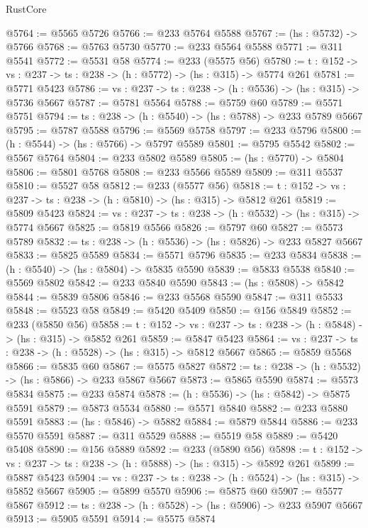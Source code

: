 \begin{lexlean}{RustCore}
\begin{coremodule}
@5764 := @5565 @5726
@5766 := @233 @5764 @5588
@5767 := (hs : @5732) -> @5766
@5768 := @5763 @5730
@5770 := @233 @5564 @5588
@5771 := @311 @5541
@5772 := @5531 @58
@5774 := @233 (@5575 @56)
@5780 := {t : @152} -> {vs : @237} -> {ts : @238} -> (h : @5772) -> (hs : @315) -> @5774 @261
@5781 := @5771 @5423
@5786 := {vs : @237} -> {ts : @238} -> (h : @5536) -> (hs : @315) -> @5736 @5667
@5787 := @5781 @5564
@5788 := @5759 @60
@5789 := @5571 @5751
@5794 := {ts : @238} -> (h : @5540) -> (hs : @5788) -> @233 @5789 @5667
@5795 := @5787 @5588
@5796 := @5569 @5758
@5797 := @233 @5796
@5800 := (h : @5544) -> (hs : @5766) -> @5797 @5589
@5801 := @5795 @5542
@5802 := @5567 @5764
@5804 := @233 @5802 @5589
@5805 := (hs : @5770) -> @5804
@5806 := @5801 @5768
@5808 := @233 @5566 @5589
@5809 := @311 @5537
@5810 := @5527 @58
@5812 := @233 (@5577 @56)
@5818 := {t : @152} -> {vs : @237} -> {ts : @238} -> (h : @5810) -> (hs : @315) -> @5812 @261
@5819 := @5809 @5423
@5824 := {vs : @237} -> {ts : @238} -> (h : @5532) -> (hs : @315) -> @5774 @5667
@5825 := @5819 @5566
@5826 := @5797 @60
@5827 := @5573 @5789
@5832 := {ts : @238} -> (h : @5536) -> (hs : @5826) -> @233 @5827 @5667
@5833 := @5825 @5589
@5834 := @5571 @5796
@5835 := @233 @5834
@5838 := (h : @5540) -> (hs : @5804) -> @5835 @5590
@5839 := @5833 @5538
@5840 := @5569 @5802
@5842 := @233 @5840 @5590
@5843 := (hs : @5808) -> @5842
@5844 := @5839 @5806
@5846 := @233 @5568 @5590
@5847 := @311 @5533
@5848 := @5523 @58
@5849 := @5420 @5409
@5850 := @156 @5849
@5852 := @233 (@5850 @56)
@5858 := {t : @152} -> {vs : @237} -> {ts : @238} -> (h : @5848) -> (hs : @315) -> @5852 @261
@5859 := @5847 @5423
@5864 := {vs : @237} -> {ts : @238} -> (h : @5528) -> (hs : @315) -> @5812 @5667
@5865 := @5859 @5568
@5866 := @5835 @60
@5867 := @5575 @5827
@5872 := {ts : @238} -> (h : @5532) -> (hs : @5866) -> @233 @5867 @5667
@5873 := @5865 @5590
@5874 := @5573 @5834
@5875 := @233 @5874
@5878 := (h : @5536) -> (hs : @5842) -> @5875 @5591
@5879 := @5873 @5534
@5880 := @5571 @5840
@5882 := @233 @5880 @5591
@5883 := (hs : @5846) -> @5882
@5884 := @5879 @5844
@5886 := @233 @5570 @5591
@5887 := @311 @5529
@5888 := @5519 @58
@5889 := @5420 @5408
@5890 := @156 @5889
@5892 := @233 (@5890 @56)
@5898 := {t : @152} -> {vs : @237} -> {ts : @238} -> (h : @5888) -> (hs : @315) -> @5892 @261
@5899 := @5887 @5423
@5904 := {vs : @237} -> {ts : @238} -> (h : @5524) -> (hs : @315) -> @5852 @5667
@5905 := @5899 @5570
@5906 := @5875 @60
@5907 := @5577 @5867
@5912 := {ts : @238} -> (h : @5528) -> (hs : @5906) -> @233 @5907 @5667
@5913 := @5905 @5591
@5914 := @5575 @5874

\end{coremodule}
\end{lexlean}

